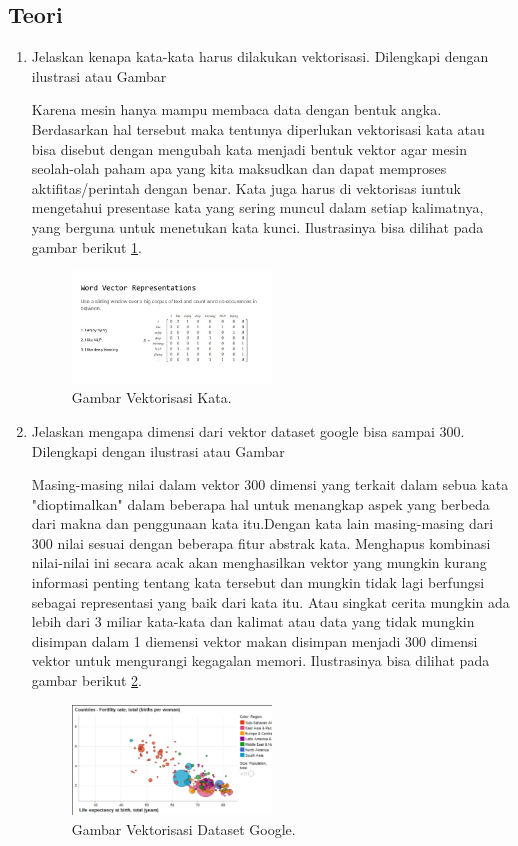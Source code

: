 \subsection{Teori}
\begin{enumerate}
\item Jelaskan kenapa kata-kata harus dilakukan vektorisasi. Dilengkapi dengan ilustrasi atau Gambar
\par Karena mesin hanya mampu membaca data dengan bentuk angka. Berdasarkan hal tersebut maka tentunya diperlukan vektorisasi kata atau bisa disebut dengan mengubah kata menjadi bentuk vektor agar mesin seolah-olah paham apa yang kita maksudkan dan dapat memproses aktifitas/perintah dengan benar. Kata juga harus di vektorisas iuntuk mengetahui presentase kata yang sering muncul dalam setiap kalimatnya, yang berguna untuk menetukan kata kunci. Ilustrasinya bisa dilihat pada gambar berikut  \ref{no1}.
\begin{figure}[ht]
\centerline{\includegraphics[width=0.5\textwidth]{figures/AFS/no1.jpg}}
\caption{Gambar Vektorisasi Kata.}
\label{no1}
\end{figure}

\item Jelaskan mengapa dimensi dari vektor dataset google bisa sampai 300. Dilengkapi dengan ilustrasi atau Gambar
\par Masing-masing nilai dalam vektor 300 dimensi yang terkait dalam sebua kata "dioptimalkan" dalam  beberapa hal untuk menangkap aspek yang  berbeda dari makna dan penggunaan kata itu.Dengan kata lain masing-masing dari 300 nilai sesuai dengan beberapa fitur abstrak kata. Menghapus kombinasi nilai-nilai ini secara acak akan menghasilkan vektor yang mungkin kurang informasi penting tentang kata tersebut dan mungkin tidak lagi berfungsi sebagai representasi yang baik dari kata itu. Atau singkat cerita mungkin ada lebih dari 3 miliar kata-kata dan kalimat atau data yang tidak mungkin disimpan dalam 1 diemensi vektor makan disimpan menjadi 300 dimensi vektor untuk mengurangi kegagalan memori.  Ilustrasinya bisa dilihat pada gambar berikut   \ref{no2}.
\begin{figure}[ht]
\centerline{\includegraphics[width=0.5\textwidth]{figures/AFS/no2.png}}
\caption{Gambar Vektorisasi Dataset Google.}
\label{no2}
\end{figure}


\end{enumerate}
